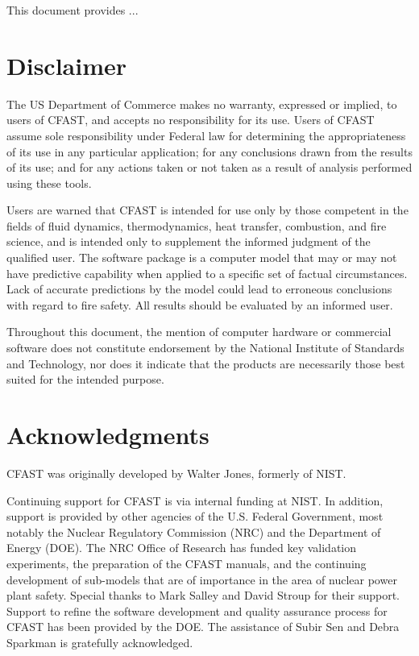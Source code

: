 \documentclass[12pt,twoside]{book}
\begin{document}
This document provides ...

%
%

\chapter{Disclaimer}

The US Department of Commerce makes no warranty, expressed or implied, to users of CFAST, and accepts no responsibility for its use. Users of CFAST assume sole responsibility under Federal law for determining the appropriateness of its use in any particular application; for any conclusions drawn from the results of its use; and for any actions taken or not taken as a result of analysis performed using these tools.

Users are warned that CFAST is intended for use only by those competent in the fields of fluid dynamics, thermodynamics, heat transfer, combustion, and fire science, and is intended only to supplement the informed judgment of the qualified user. The software package is a computer model that may or may not have predictive capability when applied to a specific set of factual circumstances. Lack of accurate predictions by the model could lead to erroneous conclusions with regard to fire safety. All results should be evaluated by an informed user.

Throughout this document, the mention of computer hardware or commercial software does not constitute endorsement by the National Institute of Standards and Technology, nor does it indicate that the products are necessarily those best suited for the intended purpose.


%
%

\chapter{Acknowledgments}

\label{acksection}

CFAST was originally developed by Walter Jones, formerly of NIST.

Continuing support for CFAST is via internal funding at NIST. In addition, support is provided by other agencies of the U.S. Federal Government, most notably the Nuclear Regulatory Commission (NRC) and the Department of Energy (DOE). The NRC Office of Research has funded key validation experiments, the preparation of the CFAST manuals, and the continuing development of sub-models that are of importance in the area of nuclear power plant safety. Special thanks to Mark Salley and David Stroup for their support. Support to refine the software development and quality assurance process for CFAST has been provided by the DOE. The assistance of Subir Sen and Debra Sparkman is gratefully acknowledged.
\end{document}
